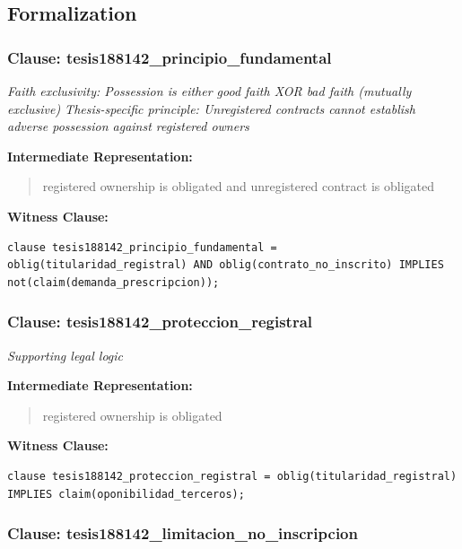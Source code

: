 \documentclass[11pt,a4paper]{article}
\begin{document}
\subsection{Formalization}

\subsubsection{Clause: tesis188142\_principio\_fundamental}

\textit{Faith exclusivity: Possession is either good faith XOR bad faith (mutually exclusive) Thesis-specific principle: Unregistered contracts cannot establish adverse possession against registered owners}

\textbf{Intermediate Representation:}

\begin{quote}
registered ownership is obligated and unregistered contract is obligated
\end{quote}

\textbf{Witness Clause:}

\begin{lstlisting}[style=witnessstyle, language=Witness]
clause tesis188142_principio_fundamental = oblig(titularidad_registral) AND oblig(contrato_no_inscrito) IMPLIES not(claim(demanda_prescripcion));
\end{lstlisting}

\subsubsection{Clause: tesis188142\_proteccion\_registral}

\textit{Supporting legal logic}

\textbf{Intermediate Representation:}

\begin{quote}
registered ownership is obligated
\end{quote}

\textbf{Witness Clause:}

\begin{lstlisting}[style=witnessstyle, language=Witness]
clause tesis188142_proteccion_registral = oblig(titularidad_registral) IMPLIES claim(oponibilidad_terceros);
\end{lstlisting}

\subsubsection{Clause: tesis188142\_limitacion\_no\_inscripcion}
\end{document}
